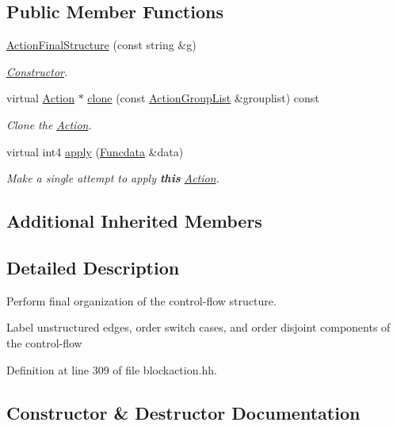 \subsection*{Public Member Functions}
\begin{DoxyCompactItemize}
\item 
\mbox{\hyperlink{class_action_final_structure_afdb0cb3d9e262d819705e7b07227a9af}{Action\+Final\+Structure}} (const string \&g)
\begin{DoxyCompactList}\small\item\em \mbox{\hyperlink{class_constructor}{Constructor}}. \end{DoxyCompactList}\item 
virtual \mbox{\hyperlink{class_action}{Action}} $\ast$ \mbox{\hyperlink{class_action_final_structure_a2e9f507eb58ffe2c4c7de862eebcb92f}{clone}} (const \mbox{\hyperlink{class_action_group_list}{Action\+Group\+List}} \&grouplist) const
\begin{DoxyCompactList}\small\item\em Clone the \mbox{\hyperlink{class_action}{Action}}. \end{DoxyCompactList}\item 
virtual int4 \mbox{\hyperlink{class_action_final_structure_a872ef94df66c1fb7acd17022b739bac2}{apply}} (\mbox{\hyperlink{class_funcdata}{Funcdata}} \&data)
\begin{DoxyCompactList}\small\item\em Make a single attempt to apply {\bfseries{this}} \mbox{\hyperlink{class_action}{Action}}. \end{DoxyCompactList}\end{DoxyCompactItemize}
\subsection*{Additional Inherited Members}


\subsection{Detailed Description}
Perform final organization of the control-\/flow structure. 

Label unstructured edges, order switch cases, and order disjoint components of the control-\/flow 

Definition at line 309 of file blockaction.\+hh.



\subsection{Constructor \& Destructor Documentation}
\mbox{\label{class_action_final_structure_afdb0cb3d9e262d819705e7b07227a9af}} 
